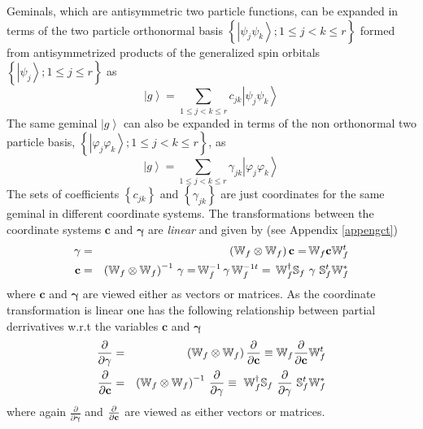 \documentclass{article}
\begin{document}
Geminals, which are antisymmetric two particle functions, can be expanded in
terms of the two particle orthonormal basis $\left\{ \left| \psi _{j}\psi
_{k}\right\rangle ;1\leq j<k\leq r\right\} $ formed from antisymmetrized
products of the generalized spin orbitals $\left\{ \left| \psi
_{j}\right\rangle ;1\leq j\leq r\right\} $ as 
\begin{equation}
\left| g\right\rangle =\sum_{1\leq j<k\leq r}c_{jk}\left| \psi _{j}\psi
_{k}\right\rangle
\end{equation}%
The same geminal $\left| g\right\rangle $ can also be expanded in terms of
the non orthonormal two particle basis, $\left\{ \left| \varphi _{j}\varphi
_{k}\right\rangle ;1\leq j<k\leq r\right\} $, as 
\begin{equation}
\left| g\right\rangle =\sum_{1\leq j<k\leq r}\gamma _{jk}\left| \varphi
_{j}\varphi _{k}\right\rangle
\end{equation}%
The sets of coefficients $\left\{ c_{jk}\right\} $ and $\left\{ \gamma
_{jk}\right\} $ are just coordinates for the same geminal in different
coordinate systems. The transformations between the coordinate systems $%
\mathbf{c}$ and $\mathbf{\gamma }$ are \emph{linear }and given by (see
Appendix \ref{appengct})%
\begin{eqnarray}
\mathbf{\gamma } &=&\,\left( \mathbb{W}_{f}\otimes \mathbb{W}_{f}\right) 
\mathbf{c=\,}\mathbb{W}_{f}\mathbf{c}\mathbb{W}_{f}^{t}  \notag \\
\mathbf{c} &=&\left( \mathbb{W}_{f}\otimes \mathbb{W}_{f}\right) ^{-1}\,%
\mathbf{\gamma =\,}\mathbb{W}_{f}^{-1}\,\mathbf{\gamma \,}\mathbb{W}%
_{f}^{-1t}=\mathbf{\,}\mathbb{W}_{f}^{\dagger }\mathbb{S}_{f}\,\,\mathbf{%
\gamma \,\,}\mathbb{S}_{f}^{t}\mathbb{W}_{f}^{\ast }
\end{eqnarray}%
where $\mathbf{c}$ and $\mathbf{\gamma }$ are viewed either as vectors or
matrices. As the coordinate transformation is linear one has the following
relationship between partial derrivatives w.r.t the variables $\mathbf{c}$
and $\mathbf{\gamma }$ 
\begin{eqnarray}
\frac{\partial }{\partial \mathbf{\gamma }} &=&\left( \mathbb{W}_{f}\otimes 
\mathbb{W}_{f}\right) \frac{\partial }{\partial \mathbf{c}}\equiv \mathbb{W}%
_{f}\frac{\partial }{\partial \mathbf{c}}\mathbb{W}_{f}^{t}  \notag \\
\frac{\partial }{\partial \mathbf{c}} &=&\left( \mathbb{W}_{f}\otimes 
\mathbb{W}_{f}\right) ^{-1}\,\frac{\partial }{\partial \mathbf{\gamma }}%
\equiv \mathbf{\,\,}\mathbb{W}_{f}^{\dagger }\mathbb{S}_{f}\,\,\frac{%
\partial }{\partial \mathbf{\gamma }}\mathbf{\,\,}\mathbb{S}_{f}^{t}\mathbb{W%
}_{f}^{\ast }  \label{coordtrans}
\end{eqnarray}%
where again $\frac{\partial }{\partial \mathbf{\gamma }}$ and $\frac{%
\partial }{\partial \mathbf{c}}$ are viewed as either vectors or matrices.
\end{document}
